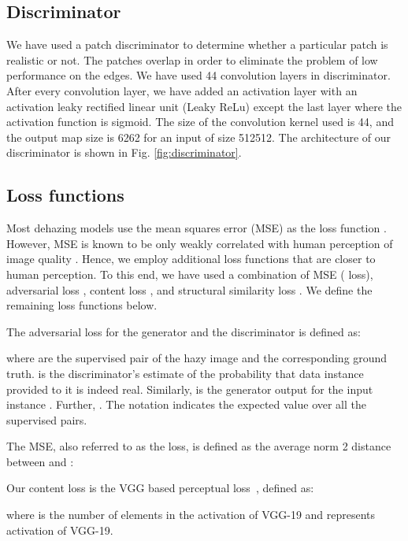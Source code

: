 \documentclass[runningheads]{llncs}
\begin{document}
\subsection{Discriminator} We have used a patch discriminator to determine whether a particular patch is realistic or not. The patches overlap in order to eliminate the problem of low performance on the edges. We have used 44 convolution layers in discriminator. After every convolution layer, we have added an activation layer with an activation leaky rectified linear unit (Leaky ReLu) except the last layer where the activation function is sigmoid. The size of the convolution kernel used is 44, and the output map size is 6262 for an input of size 512512. The architecture of our discriminator is shown in Fig. \ref{fig:discriminator}. 

\subsection{Loss functions}\label{sec:losses}
Most dehazing models use the mean squares error (MSE) as the loss function \cite{zhang2018multi}. However, MSE is known to be only weakly correlated with human perception of image quality \cite{huang2014visibility}. Hence, we employ additional loss functions that are closer to human perception. To this end, we have used a combination of MSE ( loss), adversarial loss , content loss , and structural similarity loss . We define the remaining loss functions below. 

The adversarial loss for the generator  and the discriminator  is defined as:




\noindent where  are the supervised pair of the hazy image and the corresponding ground truth. 
 is the discriminator’s estimate of the probability that data instance  provided to it is indeed real. Similarly,  is the generator output for the input instance . Further, . The notation  indicates the expected value over all the supervised pairs. 

The MSE, also referred to as the  loss, is defined as the average norm 2 distance between  and :



Our content loss is the VGG based perceptual loss~\cite{johnson2016perceptual}, defined as:



\noindent where  is the number of elements in the  activation of VGG-19 and  represents  activation of VGG-19. 
\end{document}
